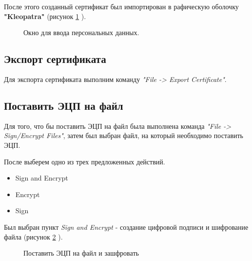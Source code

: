 \documentclass[10pt,a4paper]{report}
\begin{document}
После этого созданный сертификат был импортирован в рафическую оболочку \textbf{"Kleopatra"} (рисунок  \ref{ris:image1} ).

\begin{figure}[ht]	
\caption{Окно для ввода персональных данных.}\label{ris:image1}
\end{figure}

\subsection{Экспорт сертификата}
Для экспорта сертификата выполним команду \textit{"File ->  Export Certificate"}.

\subsection{Поставить ЭЦП на файл}
Для того, что бы поставить ЭЦП на файл была выполнена команда \textit{"File -> Sign/Encrypt Files"}, затем был выбран файл, на который необходимо поставить ЭЦП.

После выберем одно из трех предложенных действий.
\begin{itemize}
\item Sign and Encrypt
\item Encrypt
\item Sign
\end{itemize} 

Был выбран пункт \textit{Sign and Encrypt} - создание цифровой подписи и шифрование файла (рисунок \ref{ris:image2} ).\\
\begin{figure}[h]
\caption{Поставить ЭЦП на файл и зашфровать}
\label{ris:image2}
\end{figure}
\end{document}
